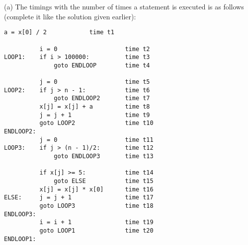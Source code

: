 
(a)
The timings with the number of times a statement is executed
is as follows (complete it like the solution given earlier):
\begin{Verbatim}[frame=single]
          a = x[0] / 2            time t1

          i = 0                   time t2           
LOOP1:    if i > 100000:          time t3
              goto ENDLOOP        time t4

          j = 0                   time t5
LOOP2:    if j > n - 1:           time t6
              goto ENDLOOP2       time t7
          x[j] = x[j] + a         time t8
          j = j + 1               time t9
          goto LOOP2              time t10
ENDLOOP2:
          j = 0                   time t11
LOOP3:    if j > (n - 1)/2:       time t12
              goto ENDLOOP3       time t13

          if x[j] >= 5:           time t14
              goto ELSE           time t15
          x[j] = x[j] * x[0]      time t16
ELSE:     j = j + 1               time t17
          goto LOOP3              time t18
ENDLOOP3:
          i = i + 1               time t19
          goto LOOP1              time t20
ENDLOOP1:
\end{Verbatim}


